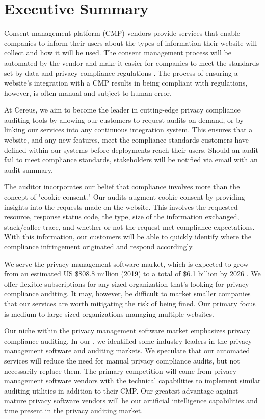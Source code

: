 {\let\cleardoublepage\relax \chapter*{Executive Summary}}

Consent management platform (CMP) vendors provide services that enable companies to inform their users about the types of information their website will collect and how it will be used. The consent management process will be automated by the vendor and make it easier for companies to meet the standards set by data and privacy compliance regulations \cite{cmp.what.2020}. The process of ensuring a website's integration with a CMP results in being compliant with regulations, however, is often manual and subject to human error.

At Cereus, we aim to become the leader in cutting-edge privacy compliance auditing tools by allowing our customers to request audits on-demand, or by linking our services into any continuous integration system. This ensures that a website, and any new features, meet the compliance standards customers have defined within our systems before deployments reach their users. Should an audit fail to meet compliance standards, stakeholders will be notified via email with an audit summary.

The auditor incorporates our belief that compliance involves more than the concept of "cookie consent." Our audits augment cookie consent by providing insights into the requests made on the website. This involves the requested resource, response status code, the type, size of the information exchanged, stack/callee trace, and whether or not the request met compliance expectations. With this information, our customers will be able to quickly identify where the compliance infringement originated and respond accordingly.

We serve the privacy management software market, which is expected to grow from an estimated US \$808.8 million (2019) to a total of \$6.1 billion by 2026 \cite{qy.2020}. We offer flexible subscriptions for any sized organization that's looking for privacy compliance auditing. It may, however, be difficult to market smaller companies that our services are worth mitigating the risk of being fined. Our primary focus is medium to large-sized organizations managing multiple websites. 

Our niche within the privacy management software market emphasizes privacy compliance auditing. In our , we identified some industry leaders in the privacy management software and auditing markets. We speculate that our automated services will reduce the need for manual privacy compliance audits, but not necessarily replace them. The primary competition will come from privacy management software vendors with the technical capabilities to implement similar auditing utilities in addition to their CMP. Our greatest advantage against mature privacy software vendors will be our artificial intelligence capabilities and time present in the privacy auditing market.

